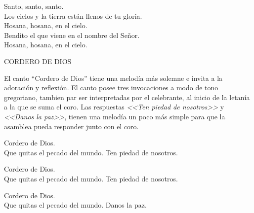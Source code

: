 \documentclass[12pt, letterpaper]{report}
\begin{document}
    \noindent
    Santo, santo, santo. \\
    Los cielos y la tierra est\'an llenos de tu gloria.\\
    Hosana, hosana, en el cielo.\\
    Bendito el que viene en el nombre del Se\~nor. \\
    Hosana, hosana, en el cielo.
    \clearpage




    \begin{center}
      {\large CORDERO DE DIOS}
    \end{center}

    El canto ``Cordero de Dios'' tiene una melod\'ia m\'as solemne e invita a la adoraci\'on y reflexi\'on. El canto posee tres invocaciones a modo de tono gregoriano, tambien par ser interpretadas por el celebrante, al inicio de la letan\'ia a la que se suma el coro. Las respuestas \textit{<<Ten piedad de nosotros>>} y \textit{<<Danos la paz>>}, tienen una melod\'ia un poco m\'as simple para que la asamblea pueda responder junto con el coro.

    \noindent
    Cordero de Dios.\\
    Que quitas el pecado del mundo. Ten piedad de nosotros.

    \noindent
    Cordero de Dios.\\
    Que quitas el pecado del mundo. Ten piedad de nosotros.

    \noindent
    Cordero de Dios.\\
    Que quitas el pecado del mundo. Danos la paz.
    \clearpage

\end{document}
